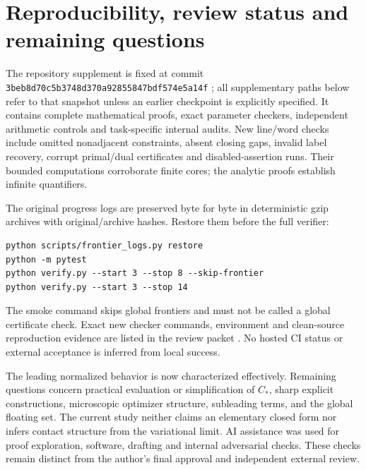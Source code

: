 \documentclass[11pt]{article}
\theoremstyle{definition}\newtheorem{definition}[theorem]{Definition}
\theoremstyle{remark}\newtheorem{remark}[theorem]{Remark}
\newcommand{\CC}{C_\ast}
\begin{document}
\section{Reproducibility, review status and remaining questions}

The repository supplement is fixed at commit
\texttt{3beb8d70c5b3748d370a92855847bdf574e5a14f} \cite{packet};
all supplementary paths below refer to that snapshot unless an earlier
checkpoint is explicitly specified. It contains complete mathematical proofs, exact
parameter checkers, independent arithmetic controls and task-specific internal
audits. New line/word checks include omitted nonadjacent constraints, absent
closing gaps, invalid label recovery, corrupt primal/dual certificates and
disabled-assertion runs. Their bounded computations corroborate finite cores;
the analytic proofs establish infinite quantifiers.

The original progress logs are preserved byte for byte in deterministic gzip
archives with original/archive hashes. Restore them before the full verifier:
\begin{verbatim}
python scripts/frontier_logs.py restore
python -m pytest
python verify.py --start 3 --stop 8 --skip-frontier
python verify.py --start 3 --stop 14
\end{verbatim}
The smoke command skips global frontiers and must not be called a global
certificate check. Exact new checker commands, environment and clean-source
reproduction evidence are listed in the review packet \cite{packet}.
No hosted CI status or external acceptance is inferred from local success.

The leading normalized behavior is now characterized effectively. Remaining
questions concern practical evaluation or simplification of $\CC$, sharp
explicit constructions, microscopic optimizer structure, subleading terms,
and the global floating set. The current study neither claims an elementary
closed form nor infers contact structure from the variational limit.
AI assistance was used for proof exploration, software, drafting and internal
adversarial checks. These checks remain distinct from the author's final
approval and independent external review.
\end{document}
